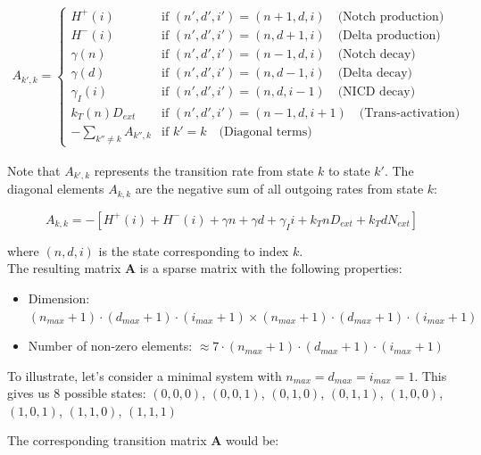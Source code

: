 \documentclass{article}
\begin{document}
\begin{flushleft}
\begin{align*}
A_{k',k} = 
\begin{cases}
H^+(i) & \text{if } (n',d',i') = (n+1,d,i) \quad \text{(Notch production)} \\
H^-(i) & \text{if } (n',d',i') = (n,d+1,i) \quad \text{(Delta production)} \\
\gamma(n) & \text{if } (n',d',i') = (n-1,d,i) \quad \text{(Notch decay)} \\
\gamma(d) & \text{if } (n',d',i') = (n,d-1,i) \quad \text{(Delta decay)} \\
\gamma_I(i) & \text{if } (n',d',i') = (n,d,i-1) \quad \text{(NICD decay)} \\
k_T(n)D_{ext} & \text{if } (n',d',i') = (n-1,d,i+1) \quad \text{(Trans-activation)} \\
-\sum_{k'' \neq k} A_{k'',k} & \text{if } k' = k \quad \text{(Diagonal terms)}
\end{cases}
\end{align*}

Note that $A_{k',k}$ represents the transition rate from state $k$ to state $k'$. The diagonal elements $A_{k,k}$ are the negative sum of all outgoing rates from state $k$:

\[
A_{k,k} = -[H^+(i) + H^-(i) + \gamma n + \gamma d + \gamma_I i + k_T n D_{ext} + k_T d N_{ext}]
\]

where $(n,d,i)$ is the state corresponding to index $k$.\\

The resulting matrix $\mathbf{A}$ is a sparse matrix with the following properties:
\begin{itemize}
    \item Dimension: $(n_{max}+1) \cdot (d_{max}+1) \cdot (i_{max}+1) \times (n_{max}+1) \cdot (d_{max}+1) \cdot (i_{max}+1)$
    \item Number of non-zero elements: $\approx 7 \cdot (n_{max}+1) \cdot (d_{max}+1) \cdot (i_{max}+1)$
\end{itemize}

To illustrate, let's consider a minimal system with $n_{max} = d_{max} = i_{max} = 1$. This gives us 8 possible states:
$(0,0,0)$, $(0,0,1)$, $(0,1,0)$, $(0,1,1)$, $(1,0,0)$, $(1,0,1)$, $(1,1,0)$, $(1,1,1)$

The corresponding transition matrix $\mathbf{A}$ would be:


\end{flushleft}
\end{document}
